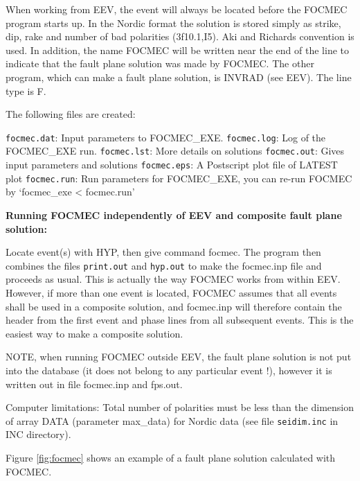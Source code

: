 When working from EEV, the event will always be located before the FOCMEC program starts up. In 
the Nordic format the solution is stored simply as 
strike, 
dip, 
rake and number of bad polarities (3f10.1,I5). Aki and Richards convention is used. In addition, the name FOCMEC will be written near the end of the line to indicate that the fault plane solution was made by FOCMEC. The other program, which can make a fault plane solution, is INVRAD (see EEV). The line type is F. 

The following files are created: 

\texttt{focmec.dat}: Input parameters to FOCMEC\_EXE. \newline
\texttt{focmec.log}: Log of the FOCMEC\_EXE run. \newline
\texttt{focmec.lst}: More details on solutions \newline
\texttt{focmec.out}: Gives input parameters and solutions \newline
\texttt{focmec.eps}: A Postscript plot file of LATEST plot  \newline
\texttt{focmec.run}: Run parameters for FOCMEC\_EXE, you can re-run FOCMEC by `focmec\_exe < focmec.run' 

\textbf{Running FOCMEC independently of EEV and composite fault plane solution:}

Locate event(s) with HYP, then give command focmec. The program then combines the files \texttt{print.out} and \texttt{hyp.out} to make the focmec.inp file and proceeds as usual. This is actually the way FOCMEC works from within EEV. However, if more than one event is located, FOCMEC assumes that all events shall be used in a composite solution, and focmec.inp will therefore contain the header from the first event and phase lines from all subsequent events. This is the easiest way to make a composite solution. 

NOTE, when running FOCMEC outside EEV, the fault plane solution is not put into the database (it does not belong to any particular event !), however it is written out in file focmec.inp 
and fps.out. 

Computer limitations: Total number of polarities must be less than the dimension of array DATA (parameter max\_data) for Nordic data (see file \texttt{seidim.inc} in INC directory). 

Figure \ref{fig:focmec} shows an example of a fault plane solution calculated with FOCMEC. 

